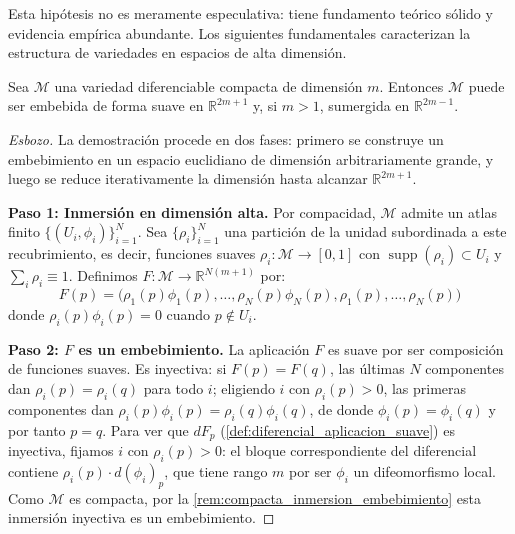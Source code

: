 Esta hipótesis no es meramente especulativa: tiene fundamento teórico sólido y evidencia empírica abundante. Los siguientes fundamentales caracterizan la estructura de variedades en espacios de alta dimensión.

\begin{theorem}\label{thm:whitney_embedding}
Sea $\mathcal{M}$ una variedad diferenciable compacta de dimensión $m$. Entonces $\mathcal{M}$ puede ser embebida de forma suave en $\mathbb{R}^{2m+1}$ y, si $m > 1$, sumergida en $\mathbb{R}^{2m-1}$.
\end{theorem}

\begin{proof}[Esbozo]
La demostración procede en dos fases: primero se construye un embebimiento en un espacio euclidiano de dimensión arbitrariamente grande, y luego se reduce iterativamente la dimensión hasta alcanzar $\mathbb{R}^{2m+1}$.

\textbf{Paso 1: Inmersión en dimensión alta.}
Por compacidad, $\mathcal{M}$ admite un atlas finito $\{(U_i, \phi_i)\}_{i=1}^N$. Sea $\{\rho_i\}_{i=1}^N$ una partición de la unidad subordinada a este recubrimiento, es decir, funciones suaves $\rho_i: \mathcal{M} \to [0,1]$ con $\operatorname{supp}(\rho_i) \subset U_i$ y $\sum_i \rho_i \equiv 1$. Definimos $F: \mathcal{M} \to \mathbb{R}^{N(m+1)}$ por:
\[
F(p) = \bigl(\rho_1(p)\phi_1(p), \ldots, \rho_N(p)\phi_N(p), \rho_1(p), \ldots, \rho_N(p)\bigr)
\]
donde $\rho_i(p)\phi_i(p) = 0$ cuando $p \notin U_i$.

\textbf{Paso 2: $F$ es un embebimiento.}
La aplicación $F$ es suave por ser composición de funciones suaves. Es inyectiva: si $F(p) = F(q)$, las últimas $N$ componentes dan $\rho_i(p) = \rho_i(q)$ para todo $i$; eligiendo $i$ con $\rho_i(p) > 0$, las primeras componentes dan $\rho_i(p)\phi_i(p) = \rho_i(q)\phi_i(q)$, de donde $\phi_i(p) = \phi_i(q)$ y por tanto $p = q$. Para ver que $dF_p$ (\autoref{def:diferencial_aplicacion_suave}) es inyectiva, fijamos $i$ con $\rho_i(p) > 0$: el bloque correspondiente del diferencial contiene $\rho_i(p) \cdot d(\phi_i)_p$, que tiene rango $m$ por ser $\phi_i$ un difeomorfismo local. Como $\mathcal{M}$ es compacta, por la \autoref{rem:compacta_inmersion_embebimiento} esta inmersión inyectiva es un embebimiento.


\end{proof}

